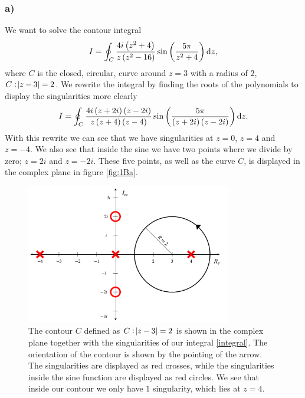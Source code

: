 \documentclass[12pt,twoside]{article}
\begin{document}
\subsubsection*{a)}
We want to solve the contour integral
\begin{equation}
  I = \oint_{C}\frac{4i\left(z^2+4\right)}{z\left(z^2-16\right)}\sin{\left( \frac{5\pi}{z^2+4} \right)} \dif z,
\end{equation}
where $C$ is the closed, circular, curve around $z=3$ with a radius of $2$, $C: \abs{z-3} = 2$. We rewrite the integral by finding the roots of the polynomials to display the singularities more clearly
\begin{equation}
  I = \oint_{C}\frac{4i\left(z+2i\right)\left(z-2i\right)}{z\left(z+4\right)\left(z-4\right)}\sin{\left( \frac{5\pi}{\left(z+2i\right)\left(z-2i\right)} \right)} \dif z. \label{integral}
\end{equation}
With this rewrite we can see that we have singularities at $z=0$, $z=4$ and $z=-4$. We also see that inside the sine we have two points where we divide by zero; $z=2i$ and $z=-2i$. These five points, as well as the curve $C$, is displayed in the complex plane in figure \vref{fig:1Ba}.\par
\begin{figure}
  \centering
  \includegraphics[width=0.8\textwidth]{../figures/contour_and_sing.pdf}
  \caption{The contour $C$ defined as $C: \abs{z-3} = 2$ is shown in the complex plane together with the singularities of our integral \eqref{integral}. The orientation of the contour is shown by the pointing of the arrow. The singularities are displayed as red crosses, while the singularities inside the sine function are displayed as red circles. We see that inside our contour we only have $1$ singularity, which lies at $z=4$.}
  \label{fig:1Ba}
\end{figure}
\end{document}
